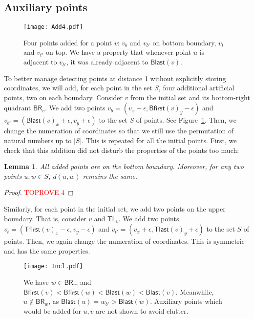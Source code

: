 \documentclass[a4paper,11pt]{article}
\newcommand{\BR}{\mathsf{BR}}
\newcommand{\TL}{\mathsf{TL}}
\newcommand{\Blast}{\mathsf{Blast}}
\newcommand{\Bfirst}{\mathsf{Bfirst}}
\newcommand{\Tlast}{\mathsf{Tlast}}
\newcommand{\Tfirst}{\mathsf{Tfirst}}
\newtheorem{lemma}[theorem]{Lemma}
\begin{document}
\subsection{Auxiliary points}

\begin{figure}[h]
\begin{center}
  \texttt{[image: Add4.pdf]}
\end{center}
\caption{Four points added for a point $v$: $v_{b}$ and $v_{b'}$ on bottom boundary, $v_{t}$ and $v_{t'}$ on top.
We have a property that whenever point $u$ is adjacent to $v_{b'}$, it was already adjacent to $\Blast(v)$.}
\label{Fig:Add4}
\end{figure}

To better manage detecting points at distance 1 without explicitly storing coordinates,
we will add, for each point in the set $S$, four additional artificial points, two on each boundary.
Consider $v$ from the initial set and its bottom-right quadrant $\BR_v$.
We add two points $v_{b}=(v_x-\epsilon, \Bfirst(v)_y-\epsilon)$ and $v_{b'}=(\Blast(v)_x+\epsilon,v_y+\epsilon)$ to the set $S$ of points.
See Figure~\ref{Fig:Add4}.
Then, we change the numeration of coordinates so that we still use the permutation of natural numbers up to $|S|$.
This is repeated for all the initial points.
First, we check that this addition did not disturb the properties of the points too much:

\begin{lemma}
All added points are on the bottom boundary.
Moreover, for any two points $u,w \in S$, $d(u,w)$ remains the same.
\end{lemma}
\begin{proof}\textcolor{red}{TOPROVE 4}\end{proof}

Similarly, for each point in the initial set, we add two points on the upper boundary.
That is, consider $v$ and $\TL_v$.
We add two points $v_{t}=(\Tfirst(v)_x-\epsilon,v_y-\epsilon)$ and $v_{t'}=(v_x+\epsilon, \Tlast(v)_y+\epsilon)$ to the set $S$ of points.
Then, we again change the numeration of coordinates.
This is symmetric and has the same properties.

\begin{figure}[h]
\begin{center}
  \texttt{[image: Incl.pdf]}
\end{center}
\caption{We have $w \in \BR_v$, and $\Bfirst(v) < \Bfirst(w) < \Blast(w) < \Blast(v)$.
Meanwhile, $u \notin \BR_w$, as $\Blast(u)=w_{b'}>\Blast(w)$.
Auxiliary points which would be added for $u,v$ are not shown to avoid clutter.}
\label{Fig:Incl}
\end{figure}
\end{document}
